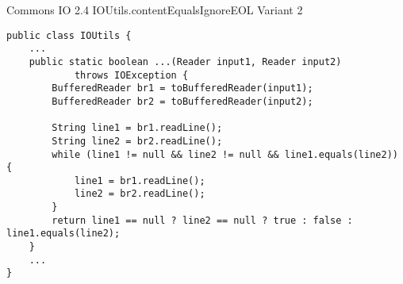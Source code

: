 \begin{listing}
\caption{Commons IO 2.4 IOUtils.contentEqualsIgnoreEOL Variant 2}
\label{lst:ioutils.contentequalsignoreeol-variant1}
\begin{verbatim}
public class IOUtils {
	...
    public static boolean ...(Reader input1, Reader input2)
            throws IOException {
        BufferedReader br1 = toBufferedReader(input1);
        BufferedReader br2 = toBufferedReader(input2);

        String line1 = br1.readLine();
        String line2 = br2.readLine();
        while (line1 != null && line2 != null && line1.equals(line2)) {
            line1 = br1.readLine();
            line2 = br2.readLine();
        }
        return line1 == null ? line2 == null ? true : false : line1.equals(line2);
    }
    ...
}
\end{verbatim}
\end{listing}